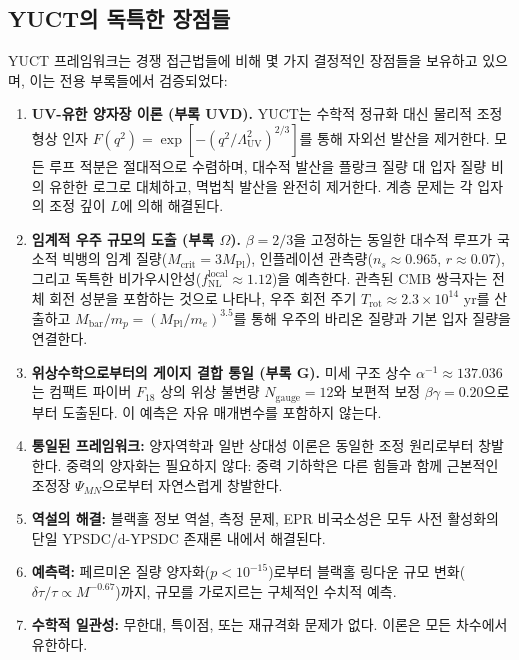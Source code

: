 \documentclass[11pt,a4paper]{article}
\theoremstyle{remark}
\begin{document}
	\subsection{YUCT의 독특한 장점들}
	
	YUCT 프레임워크는 경쟁 접근법들에 비해 몇 가지 결정적인 장점들을 보유하고 있으며, 이는 전용 부록들에서 검증되었다:
	
	\begin{enumerate}
		\item \textbf{UV-유한 양자장 이론 (부록 UVD).}
		YUCT는 수학적 정규화 대신 물리적 조정 형상 인자 $F(q^2)=\exp[-(q^2/\Lambda_{\mathrm{UV}}^2)^{2/3}]$를 통해 자외선 발산을 제거한다. 모든 루프 적분은 절대적으로 수렴하며, 대수적 발산을 플랑크 질량 대 입자 질량 비의 유한한 로그로 대체하고, 멱법칙 발산을 완전히 제거한다. 계층 문제는 각 입자의 조정 깊이 $L$에 의해 해결된다.
		
		\item \textbf{임계적 우주 규모의 도출 (부록 $\Omega$).}
		$\beta=2/3$을 고정하는 동일한 대수적 루프가 국소적 빅뱅의 임계 질량($M_{\mathrm{crit}}=3M_{\mathrm{Pl}}$), 인플레이션 관측량($n_s\approx0.965$, $r\approx0.07$), 그리고 독특한 비가우시안성($f_{\mathrm{NL}}^{\mathrm{local}}\approx1.12$)을 예측한다. 관측된 CMB 쌍극자는 전체 회전 성분을 포함하는 것으로 나타나, 우주 회전 주기 $T_{\mathrm{rot}}\approx2.3\times10^{14}$ yr를 산출하고 $M_{\mathrm{bar}}/m_p=(M_{\mathrm{Pl}}/m_e)^{3.5}$를 통해 우주의 바리온 질량과 기본 입자 질량을 연결한다.
		
		\item \textbf{위상수학으로부터의 게이지 결합 통일 (부록 G).}
		미세 구조 상수 $\alpha^{-1}\approx137.036$는 컴팩트 파이버 $F_{18}$ 상의 위상 불변량 $N_{\mathrm{gauge}}=12$와 보편적 보정 $\beta\gamma=0.20$으로부터 도출된다. 이 예측은 자유 매개변수를 포함하지 않는다.
		
		\item \textbf{통일된 프레임워크:} 양자역학과 일반 상대성 이론은 동일한 조정 원리로부터 창발한다. 중력의 양자화는 필요하지 않다: 중력 기하학은 다른 힘들과 함께 근본적인 조정장 $\Psi_{MN}$으로부터 자연스럽게 창발한다.
		
		\item \textbf{역설의 해결:} 블랙홀 정보 역설, 측정 문제, EPR 비국소성은 모두 사전 활성화의 단일 YPSDC/d-YPSDC 존재론 내에서 해결된다.
		
		\item \textbf{예측력:} 페르미온 질량 양자화($p<10^{-15}$)로부터 블랙홀 링다운 규모 변화($\delta\tau/\tau\propto M^{-0.67}$)까지, 규모를 가로지르는 구체적인 수치적 예측.
		
		\item \textbf{수학적 일관성:} 무한대, 특이점, 또는 재규격화 문제가 없다. 이론은 모든 차수에서 유한하다.
	\end{enumerate}
	
\end{document}
